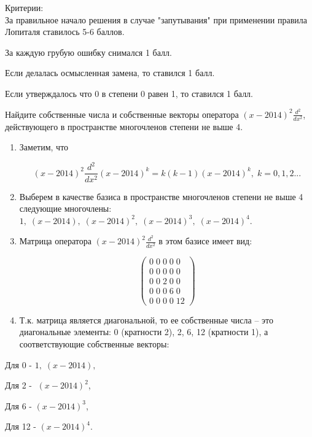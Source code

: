 \documentclass[addpoints, answers]{exam} %
\begin{document}
\begin{questions}
\begin{solution}
Критерии:\\
За правильное начало решения в случае "запутывания" при применении правила Лопиталя ставилось 5-6 баллов.

За каждую грубую ошибку снимался 1 балл.

Если делалась осмысленная замена, то ставился 1 балл.

Если утверждалось что 0 в степени 0 равен 1, то ставился 1 балл.
\end{solution}

\question[10] Найдите собственные числа и собственные векторы оператора $(x-2014)^{2} \frac{d^{2} }{dx^{2} } $, действующего в пространстве многочленов степени не выше 4.



\begin{solution}

\begin{enumerate}
\item Заметим, что

\[(x-2014)^{2} \frac{d^{2} }{dx^{2} } (x-2014)^{k} =k(k-1)(x-2014)^{k} ,\; k=0,1,2...\]

\item  Выберем в качестве базиса в пространстве многочленов степени не выше 4 следующие многочлены: $1,\; (x-2014),\; (x-2014)^{2} ,\; (x-2014)^{3} ,\; (x-2014)^{4} $.

\item  Матрица оператора $(x-2014)^{2} \frac{d^{2} }{dx^{2} } $ в этом базисе имеет вид:

\[\left(\begin{array}{l} {0\; 0\; 0\; 0\; 0} \\ {0\; 0\; 0\; 0\; 0} \\ {0\; 0\; 2\; 0\; 0} \\ {0\; 0\; 0\; 6\; 0} \\ {0\; 0\; 0\; 0\; 12} \end{array}\right)\]

\item  Т.к. матрица является диагональной, то ее собственные числа -- это диагональные элементы: 0 (кратности 2), 2, 6, 12 (кратности 1), а соответствующие собственные векторы:
\end{enumerate}

Для 0 - $1,\; (x-2014),\; $

Для 2 - $\; (x-2014)^{2} $,

Для 6 - $(x-2014)^{3} $,

Для 12 - $(x-2014)^{4} $.


\end{solution}
\end{questions}
\end{document}
